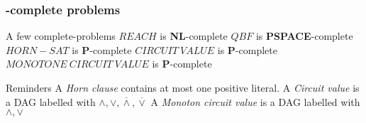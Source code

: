 \documentclass[pdf]{beamer}
\newcommand{\ol}[1]{\overline{#1}}
\newcommand{\mc}[1]{\mathcal{#1}} %
\begin{document}
\begin{frame}
\frametitle{\mc{C}-complete problems}

\begin{block}{A few complete-problems}
$REACH$ is \textbf{NL}-complete \newline 
$QBF$ is \textbf{PSPACE}-complete \newline 
$HORN-SAT$ is \textbf{P}-complete \newline 
$CIRCUIT~VALUE$ is  \textbf{P}-complete \newline 
$MONOTONE~CIRCUIT~VALUE$ is \textbf{P}-complete \newline 
\end{block}


\begin{exampleblock}{Reminders}
A \emph{Horn clause} contains at most one positive literal. \newline
A \emph{Circuit value} is a DAG labelled with $\wedge, \vee, \ol{\wedge}, \ol{\vee}$ \newline
A \emph{Monoton circuit value} is a DAG labelled with $\wedge, \vee$ \newline
\end{exampleblock}

\end{frame}
\end{document}
